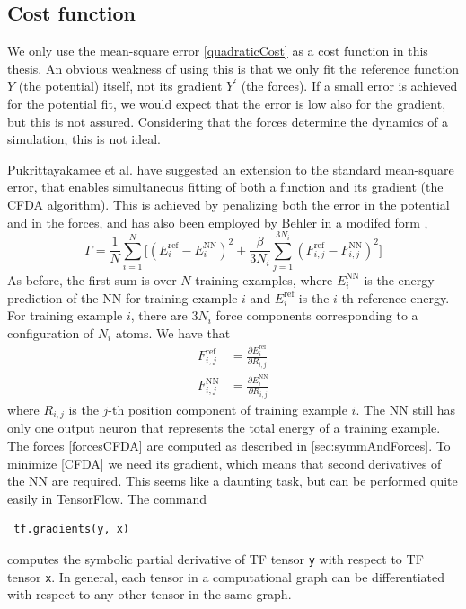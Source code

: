 \documentclass[twoside,english]{uiofysmaster}
\begin{document}
\subsection{Cost function} \label{sec:hyperParamsCostFunction}
We only use the mean-square error \eqref{quadraticCost} as a cost function in this thesis. 
An obvious weakness of using this is that we only fit the reference function $Y$ (the potential) itself, 
not its gradient $Y^\prime$ (the forces). If a small error is achieved for the potential fit, we would expect that 
the error is low also for the gradient, but this is not assured. Considering that the forces determine the 
dynamics of a simulation, this is not ideal. 

Pukrittayakamee et al. \cite{Pukrittayakamee09} have suggested an extension to the standard mean-square error, that 
enables simultaneous fitting of both a function and its gradient (the CFDA algorithm). 
This is achieved by penalizing both the error 
in the potential and in the forces, and has also been employed by Behler in a modifed form \cite{Behler15},
\begin{equation}
 \Gamma = \frac{1}{N}\sum_{i=1}^N \biggr[(E_i^{\mathrm{ref}} - E_i^{\mathrm{NN}})^2 + 
 \frac{\beta}{3N_i}\sum_{j=1}^{3N_i} (F_{i,j}^{\mathrm{ref}} - F_{i,j}^{\mathrm{NN}})^2 \biggr]
 \label{CFDA}
\end{equation}
As before, the first sum is over $N$ training examples, where $E_i^{\mathrm{NN}}$
is the energy prediction of the NN for training example $i$ and $E_i^{\mathrm{ref}}$ is the $i$-th reference energy. 
For training example $i$, there are $3N_i$ force components corresponding to a configuration of $N_i$ atoms. We have that 
\begin{align}
 F_{i,j}^{\mathrm{ref}} &= \frac{\partial E_i^{\mathrm{ref}}}{\partial R_{i,j}} \\
 F_{i,j}^{\mathrm{NN}} &= \frac{\partial E_i^{\mathrm{NN}}}{\partial R_{i,j}}
 \label{forcesCFDA}
\end{align}
where $R_{i,j}$ is the $j$-th position component of training example $i$. The NN still has only one output neuron
that represents the total energy of a training example. The forces \eqref{forcesCFDA} are computed as
described in \autoref{sec:symmAndForces}.
To minimize \eqref{CFDA} we need its gradient, which means that second derivatives of the NN 
are required. This seems like a daunting task, but can be performed quite easily in TensorFlow. 
The command
\begin{verbatim}
 tf.gradients(y, x)
\end{verbatim}
computes the symbolic partial derivative of TF tensor \texttt{y} with respect to TF tensor \texttt{x}. In general, each tensor 
in a computational graph can be differentiated with respect to any other tensor in the same graph. 
\end{document}
